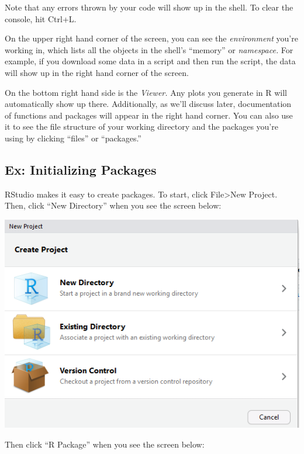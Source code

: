 \documentclass[
]{book}
\begin{document}
Note that any errors thrown by your code will show up in the shell. To clear the console, hit Ctrl+L.

On the upper right hand corner of the screen, you can see the \emph{environment} you're working in, which lists all the objects in the shell's ``memory'' or \emph{namespace.} For example, if you download some data in a script and then run the script, the data will show up in the right hand corner of the screen.

On the bottom right hand side is the \emph{Viewer.} Any plots you generate in R will automatically show up there. Additionally, as we'll discuss later, documentation of functions and packages will appear in the right hand corner. You can also use it to see the file structure of your working directory and the packages you're using by clicking ``files'' or ``packages.''

\hypertarget{ex-initializing-packages}{%
\subsection{Ex: Initializing Packages}\label{ex-initializing-packages}}

RStudio makes it easy to create packages. To start, click File\textgreater New Project. Then, click ``New Directory'' when you see the screen below:

\includegraphics{images/packageSS/createproj1.PNG}

Then click ``R Package'' when you see the screen below:
\end{document}
